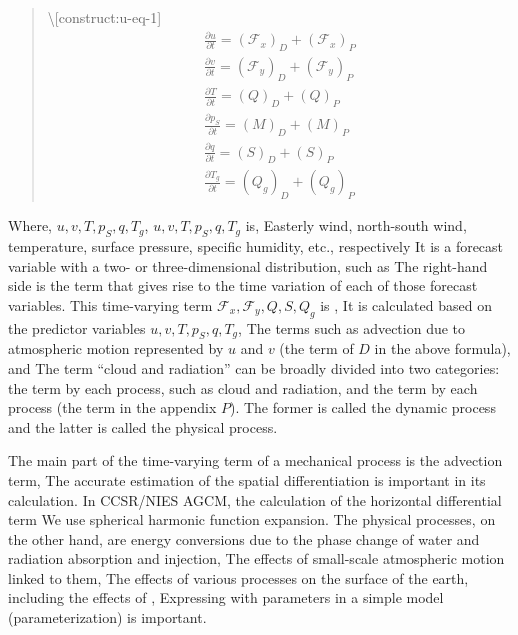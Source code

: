 \begin{quote}
\protect\hypertarget{struct:u-eq-1}{}{\textbackslash{[}construct:u-eq-1{]}}
\begin{eqnarray}
\frac{\partial u}{\partial t}  =  \left( {\mathcal F}_x \right)_D + \left( {\mathcal F}_x \right)_P 
\\
\frac{\partial v}{\partial t}  =  \left( {\mathcal F}_y \right)_D + \left( {\mathcal F}_y \right)_P \\
\frac{\partial T}{\partial t}  =  \left( Q \right)_D + \left( Q \right)_P \\
\frac{\partial p_S}{\partial t}  =  \left( M \right)_D + \left( M \right)_P \\
\frac{\partial q}{\partial t}  =  \left( S \right)_D + \left( S \right)_P \\
\frac{\partial T_g}{\partial t}  =  \left( Q_g \right)_D + \left( Q_g \right)_P 
\end{eqnarray}
\end{quote}

Where, \(u,v,T,p_S,q,T_g\), \(u,v,T,p_S,q,T_g\) is, Easterly wind,
north-south wind, temperature, surface pressure, specific humidity,
etc., respectively It is a forecast variable with a two- or
three-dimensional distribution, such as The right-hand side is the term
that gives rise to the time variation of each of those forecast
variables. This time-varying term
\({\mathcal F}_x,{\mathcal F}_y,Q,S,Q_g\) is , It is calculated based on
the predictor variables \(u,v,T,p_S,q,T_g\), The terms such as advection
due to atmospheric motion represented by \(u\) and \(v\) (the term of
\(D\) in the above formula), and The term ``cloud and radiation'' can be
broadly divided into two categories: the term by each process, such as
cloud and radiation, and the term by each process (the term in the
appendix \(P\)). The former is called the dynamic process and the latter
is called the physical process.

The main part of the time-varying term of a mechanical process is the
advection term, The accurate estimation of the spatial differentiation
is important in its calculation. In CCSR/NIES AGCM, the calculation of
the horizontal differential term We use spherical harmonic function
expansion. The physical processes, on the other hand, are energy
conversions due to the phase change of water and radiation absorption
and injection, The effects of small-scale atmospheric motion linked to
them, The effects of various processes on the surface of the earth,
including the effects of , Expressing with parameters in a simple model
(parameterization) is important.

